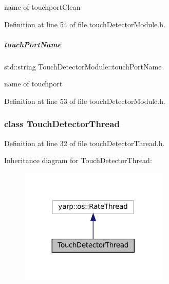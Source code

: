 name of touchport\+Clean 



Definition at line 54 of file touch\+Detector\+Module.\+h.

\mbox{\label{group__touchDetector_ab0eb1712b7c3a8c0d8c9b89fb42a2b60}} 
\subparagraph{\texorpdfstring{touch\+Port\+Name}{touchPortName}}
{\footnotesize\ttfamily std\+::string Touch\+Detector\+Module\+::touch\+Port\+Name\hspace{0.3cm}{\ttfamily [protected]}}



name of touchport 



Definition at line 53 of file touch\+Detector\+Module.\+h.

\label{classTouchDetectorThread}
\subsubsection{class Touch\+Detector\+Thread}


Definition at line 32 of file touch\+Detector\+Thread.\+h.



Inheritance diagram for Touch\+Detector\+Thread\+:
\nopagebreak
\begin{figure}[H]
\begin{center}
\leavevmode
\includegraphics[width=200pt]{classTouchDetectorThread__inherit__graph}
\end{center}
\end{figure}

